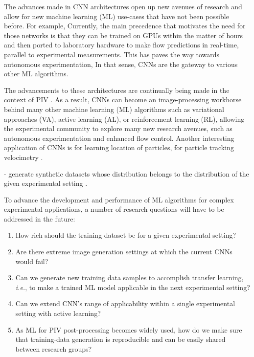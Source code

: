 \documentclass[a4paper,fleqn]{cas-dc}
\begin{document}

The advances made in CNN architectures open up new avenues of research and allow for new machine learning (ML) use-cases that have not been possible before. For example, 
Currently, the main precedence that motivates the need for those networks is that they can be trained on GPUs within the matter of hours and then ported to laboratory hardware to make flow predictions in real-time, parallel to experimental measurements. This has paves the way towards autonomous experimentation, 
 In that sense, CNNs are the gateway to various other ML algorithms.

The advancements to these architectures are continually being made in the context of PIV \citep{shan2024lightweight, elrefaie2024site}.  As a result, CNNs can become an image-processing workhorse behind many other machine learning (ML) algorithms such as variational approaches (VA), active learning (AL), or reinforcement learning (RL), allowing the experimental community to explore many new research avenues, such as autonomous experimentation and enhanced flow control. Another interesting application of CNNs is for learning location of particles, for particle tracking velocimetry \cite{godbersen2024peak}.

- generate synthetic datasets whose distribution belongs to the distribution of the given experimental setting \cite{lagemann2024challenges}.

To advance the development and performance of ML algorithms for complex experimental applications, a number of research questions will have to be addressed in the future:
\begin{enumerate}
\item How rich should the training dataset be for a given experimental setting?
\item Are there extreme image generation settings at which the current CNNs would fail?
\item Can we generate new training data samples to accomplish transfer learning, \textit{i.e.}, to make a trained ML model applicable in the next experimental setting?
\item Can we extend CNN's range of applicability within a single experimental setting with active learning?
\item As ML for PIV post-processing becomes widely used, how do we make sure that training-data generation is reproducible and can be easily shared between research groups?
\end{enumerate}
\end{document}
